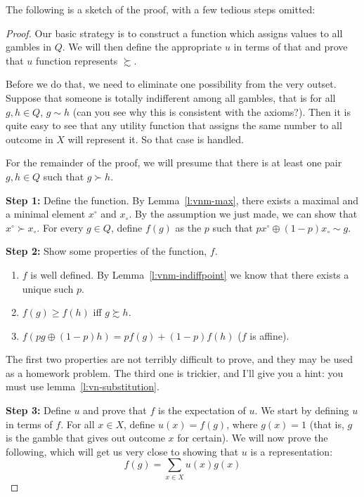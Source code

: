 The following is a sketch of the proof, with a few tedious steps omitted: 
\begin{proof}
Our basic strategy is to construct a function which assigns values to all gambles in $Q$.  We will then define the appropriate $u$ in terms of that and prove that $u$ function represents $\succsim$.  

Before we do that, we need to eliminate one possibility from the very outset.  Suppose that someone is totally indifferent among all gambles, that is for all $g, h \in Q$, $g \sim h$ (can you see why this is consistent with the axioms?).  Then it is quite easy to see that any utility function that assigns the same number to all outcome in $X$ will represent it. So that case is handled. 

For the remainder of the proof, we will presume that there is at least one pair $g, h \in Q$ such that $g \succ h$.

{\bf Step 1:} Define the function.  By Lemma~\ref{l:vnm-max}, there exists a maximal and a minimal element $x^\circ$ and $x_\circ$. By the assumption we just made, we can show that $x^\circ \succ x_\circ$.  For every $g \in Q$, define $f(g)$ as the $p$ such that $p x^\circ \oplus (1-p) x_\circ \sim g$.

{\bf Step 2:} Show some properties of the function, $f$.
\begin{enumerate}
    \item $f$ is well defined.  By Lemma~\ref{l:vnm-indiffpoint} we know that there exists a unique such $p$.
    \item $f(g) \geq f(h)$ iff $g \succsim h$.  
    \item $f(pg \oplus (1-p)h) = pf(g) + (1-p)f(h)$ ($f$ is affine).
\end{enumerate} 

The first two properties are not terribly difficult to prove, and they may be used as a homework problem.  The third one is trickier, and I'll give you a hint: you must use lemma~\ref{l:vn-substitution}.

{\bf Step 3:} Define $u$ and prove that $f$ is the expectation of $u$. We start by defining $u$ in terms of $f$. For all $x \in X$, define $u(x) = f(g)$, where $g(x) = 1$ (that is, $g$ is the gamble that gives out outcome $x$ for certain). We will now prove the following, which will get us very close to showing that $u$ is a representation:
\begin{equation}
\label{e:vn-induction}
f(g) = \sum_{x \in X} u(x)g(x)
\end{equation}


\end{proof}
